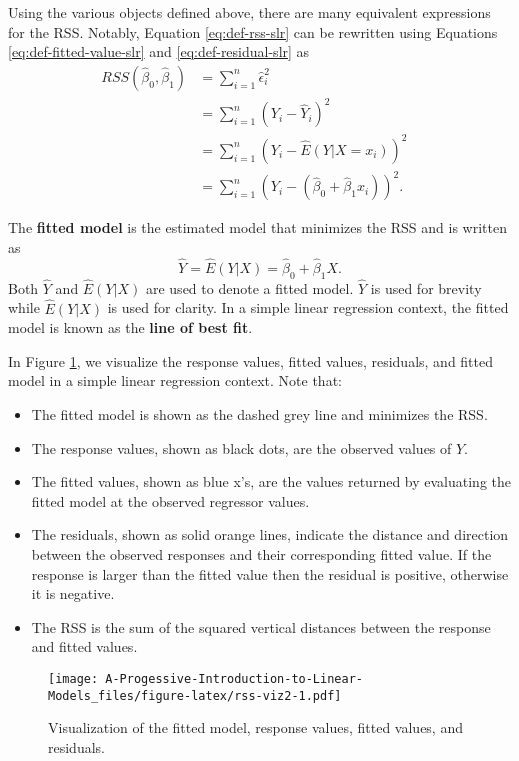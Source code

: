 \documentclass[
]{book}
\providecommand{\tightlist}{%
  \setlength{\itemsep}{0pt}\setlength{\parskip}{0pt}}
\theoremstyle{definition}
\theoremstyle{definition}
\theoremstyle{definition}
\theoremstyle{definition}
\theoremstyle{remark}
\begin{document}
Using the various objects defined above, there are many equivalent expressions for the RSS. Notably, Equation \eqref{eq:def-rss-slr} can be rewritten using Equations \eqref{eq:def-fitted-value-slr} and \eqref{eq:def-residual-slr} as
\[
\begin{aligned}
RSS(\hat{\beta}_0, \hat{\beta}_1) &= \sum_{i=1}^n \hat{\epsilon}_i^2 \\
&= \sum_{i=1}^n (Y_i - \hat{Y}_i)^2 & \\
&= \sum_{i=1}^n (Y_i - \hat{E}(Y|X=x_i))^2 \\
&= \sum_{i=1}^n (Y_i - (\hat{\beta}_0 + \hat{\beta}_1 x_i))^2.
\end{aligned}
\label{eq:equiv-def-rss-slr}
\]

The \textbf{fitted model} is the estimated model that minimizes the RSS and is written as
\[
\hat{Y}=\hat{E}(Y|X) = \hat{\beta}_0 + \hat{\beta}_1 X. \label{eq:def-fitted-model-slr}
\]
Both \(\hat{Y}\) and \(\hat{E}(Y|X)\) are used to denote a fitted model. \(\hat{Y}\) is used for brevity while \(\hat{E}(Y|X)\) is used for clarity. In a simple linear regression context, the fitted model is known as the \textbf{line of best fit}.

In Figure \ref{fig:rss-viz2}, we visualize the response values, fitted values, residuals, and fitted model in a simple linear regression context. Note that:

\begin{itemize}
\tightlist
\item
  The fitted model is shown as the dashed grey line and minimizes the RSS.
\item
  The response values, shown as black dots, are the observed values of \(Y\).
\item
  The fitted values, shown as blue x's, are the values returned by evaluating the fitted
  model at the observed regressor values.
\item
  The residuals, shown as solid orange lines, indicate the distance and direction between the observed responses and their corresponding fitted value. If the response is larger than the fitted value then the residual is positive, otherwise it is negative.
\item
  The RSS is the sum of the squared vertical distances between the response and fitted values.
\end{itemize}

\begin{figure}
\centering
\texttt{[image: A-Progessive-Introduction-to-Linear-Models\_files/figure-latex/rss-viz2-1.pdf]}
\caption{\label{fig:rss-viz2}Visualization of the fitted model, response values, fitted values, and residuals.}
\end{figure}
\end{document}
